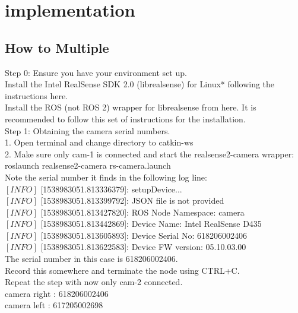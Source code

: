 \chapter{implementation}
\section{How to Multiple}
Step 0: Ensure you have your environment set up.\\
Install the Intel RealSense SDK 2.0 (librealsense) for Linux* following the instructions here.\\
Install the ROS (not ROS 2) wrapper for librealsense from here. It is recommended to follow this set of instructions for the installation.\\

Step 1: Obtaining the camera serial numbers.\\

1. Open terminal and change directory to catkin-ws\\

2. Make sure only cam-1 is connected and start the realsense2-camera wrapper:\\
roslaunch realsense2-camera rs-camera.launch\\
Note the serial number it finds in the following log line:\\
$[INFO]$ [1538983051.813336379]: setupDevice...\\
$[INFO]$ [1538983051.813399792]: JSON file is not provided\\
$[INFO]$ [1538983051.813427820]: ROS Node Namespace: camera\\
$[INFO]$ [1538983051.813442869]: Device Name: Intel RealSense D435\\
$[INFO]$ [1538983051.813605893]: Device Serial No: 618206002406\\
$[INFO]$ [1538983051.813622583]: Device FW version: 05.10.03.00\\
The serial number in this case is 618206002406.\\
Record this somewhere and terminate the node using CTRL+C.\\
Repeat the step with now only cam-2 connected.\\
   camera right : 618206002406\\
   camera left  : 617205002698\\
   
